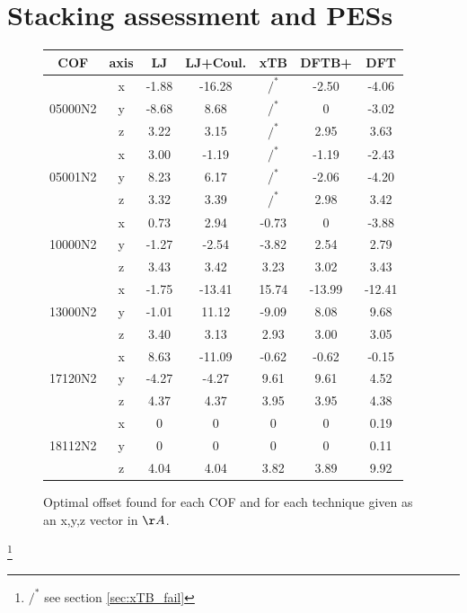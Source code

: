 \section{Stacking assessment and PESs}
\begin{figure}%
\centering
\begin{tabular}{|c||c|c|c|c|c|c|}
\hline
COF & axis & LJ & LJ+Coul. & xTB & DFTB+ & DFT\\
\hline
\hline
\multirow{3}{*}[-0.3cm]{05000N2}&x&-1.88&-16.28&$/^*$&-2.50&-4.06\\
\cline{2-7}
&y&-8.68&8.68&$/^*$&0&-3.02\\
\cline{2-7}
&z&3.22&3.15&$/^*$&2.95&3.63\\
\hline
\hline
\multirow{3}{*}[-0.3cm]{05001N2}&x&3.00&-1.19&$/^*$&-1.19&-2.43\\
\cline{2-7}
&y&8.23&6.17&$/^*$&-2.06&-4.20\\
\cline{2-7}
&z&3.32&3.39&$/^*$&2.98&3.42\\
\hline
\hline
\multirow{3}{*}[-0.3cm]{10000N2}&x&0.73&2.94&-0.73&0&-3.88\\
\cline{2-7}
&y&-1.27&-2.54&-3.82&2.54&2.79\\
\cline{2-7}
&z&3.43&3.42&3.23&3.02&3.43\\
\hline
\hline
\multirow{3}{*}[-0.3cm]{13000N2}&x&-1.75&-13.41&15.74&-13.99&-12.41\\
\cline{2-7}
&y&-1.01&11.12&-9.09&8.08&9.68\\
\cline{2-7}
&z&3.40&3.13&2.93&3.00&3.05\\
\hline
\hline
\multirow{3}{*}[-0.3cm]{17120N2}&x&8.63&-11.09&-0.62&-0.62&-0.15\\
\cline{2-7}
&y&-4.27&-4.27&9.61&9.61&4.52\\
\cline{2-7}
&z&4.37&4.37&3.95&3.95&4.38\\
\hline
\hline
\multirow{3}{*}[-0.3cm]{18112N2}&x&0&0&0&0&0.19\\
\cline{2-7}
&y&0&0&0&0&0.11\\
\cline{2-7}
&z&4.04&4.04&3.82&3.89&9.92\\
\hline
\end{tabular}

\caption{Optimal offset found for each COF and for each technique given as an x,y,z vector in $\AA$.} 
\label{fig:overview}
\end{figure}

\let\thefootnote\relax\footnote{ $/^*$ see section \ref{sec:xTB_fail}}



